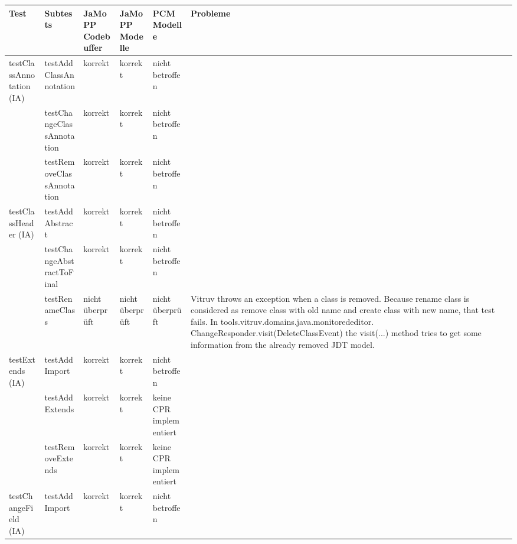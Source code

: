 \begin{tiny}




\begin{longtable}[c]{|p{2.2cm}|p{3.5cm}|p{1cm}|p{1cm}|p{1cm}|p{4cm}|}

\hline
Test & Subtests & JaMoPP Codebuffer & JaMoPP Modelle & PCM Modelle & Probleme \\ \hline
\endhead
%
testClassAnnotation 			(IA) & testAddClassAnnotation & korrekt & korrekt & nicht 			betroffen &  \\ \hline
 & testChangeClassAnnotation & korrekt & korrekt & nicht 			betroffen &  \\ \hline
 & testRemoveClassAnnotation & korrekt & korrekt & nicht 			betroffen &  \\ \hline
testClassHeader 			(IA) & testAddAbstract & korrekt & korrekt & nicht 			betroffen &  \\ \hline
 & testChangeAbstractToFinal & korrekt & korrekt & nicht 			betroffen &  \\ \hline
 & testRenameClass & nicht 			überprüft & nicht 			überprüft & nicht 			überprüft & Vitruv throws an exception when a class is removed. Because rename class is considered as remove class with old name and create class with new name, that test fails. In tools.vitruv.domains.java.monitorededitor. ChangeResponder.visit(DeleteClassEvent) the visit(...) method tries to get some information from the already removed JDT model. \\ \hline
testExtends (IA) & testAddImport & korrekt & korrekt & nicht 			betroffen &  \\ \hline
 & testAddExtends & korrekt & korrekt & keine 			CPR implementiert &  \\ \hline
 & testRemoveExtends & korrekt & korrekt & keine 			CPR implementiert &  \\ \hline
testChangeField 			(IA) & testAddImport & korrekt & korrekt & nicht 			betroffen &  \\ \hline

\end{longtable}
\end{tiny}
